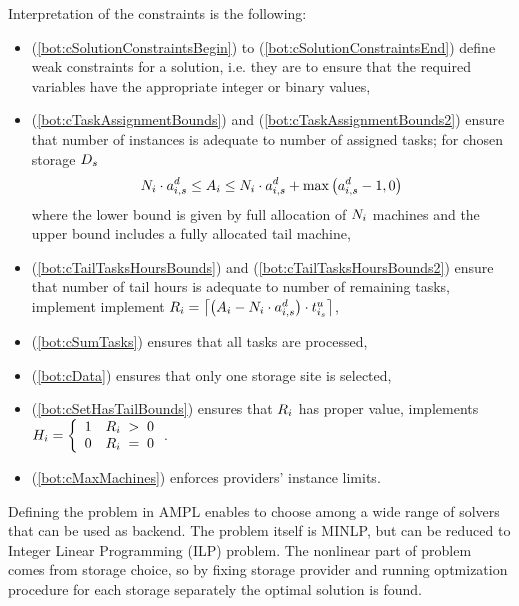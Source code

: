 {  Interpretation of the constraints is the following:
  \begin{itemize}
      \item(\ref{bot:cSolutionConstraintsBegin}) to
      (\ref{bot:cSolutionConstraintsEnd}) define weak constraints for a solution, i.e. they are to ensure that the required variables have the appropriate integer or binary values,
      \item(\ref{bot:cTaskAssignmentBounds}) and (\ref{bot:cTaskAssignmentBounds2}) ensure that number of instances is adequate to number of assigned tasks; for chosen storage $\DataAssignment_s$
      \begin{align*}
          \NumberInstances_i \cdot \tasksPerDeadline_{i,s} \leq \TaskAssignment_i \leq \NumberInstances_i \cdot \tasksPerDeadline_{i,s} + \max\left(\tasksPerDeadline_{i,s} - 1, 0\right)
      \end{align*} where the lower bound is given by full allocation of $\NumberInstances_i$ machines and the upper bound includes a fully allocated tail machine,
      \item(\ref{bot:cTailTasksHoursBounds}) and (\ref{bot:cTailTasksHoursBounds2})
      ensure that number of tail hours is adequate to number of remaining
      tasks, implement implement $\TailTaskHours_i = \ceil*{\left(\TaskAssignment_i - \NumberInstances_i \cdot \tasksPerDeadline_{i,s}\right) \cdot \unitTime_{i_s}}$,
      \item(\ref{bot:cSumTasks}) ensures that all tasks are processed,
      \item(\ref{bot:cData}) ensures that only one storage site is selected,
      \item(\ref{bot:cSetHasTailBounds}) ensures that $\TailTaskHours_i$ has proper value,
      implements $\HasTail_i = \left\{\begin{array}{cc} 1 & \TailTaskHours_i\; >\; 0 \\ 0 & \TailTaskHours_i\; =\; 0 \end{array}\right.$. %
      \item(\ref{bot:cMaxMachines}) enforces providers' instance limits. 
  \end{itemize}

  Defining the problem in AMPL enables to choose among a wide range of solvers that can be used as backend. The problem itself is MINLP, but can be reduced to Integer Linear Programming (ILP) problem. The nonlinear part of problem comes from storage choice, so by fixing storage provider and running optmization procedure for each storage separately the optimal solution is found.

}
